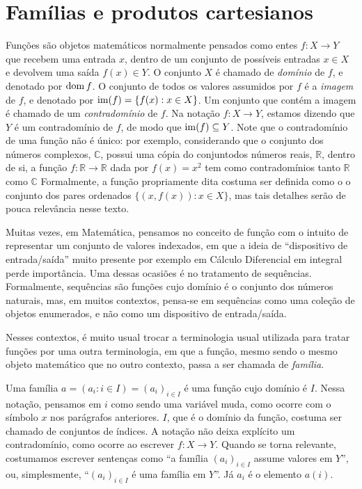 \section{Famílias e produtos cartesianos}
Funções são objetos matemáticos normalmente pensados como entes $f:X\rightarrow Y$ que recebem uma entrada $x$, dentro de um conjunto de possíveis entradas $x \in X$ e devolvem uma saída $f(x)\in Y$.
O conjunto $X$ é chamado de \emph{domínio} de $f$, e denotado por $\operatorname{dom} f$. O conjunto de todos os valores assumidos por $f$ é a \emph{imagem} de $f$, e denotado por $\operatorname{im}(f)=\{f(x): x \in X\}$.
Um conjunto que contém a imagem é chamado de um \emph{contradomínio} de $f$.
Na notação $f:X\rightarrow Y$, estamos dizendo que $Y$ é um contradomínio de $f$, de modo que $\operatorname{im}(f)\subseteq Y$.
Note que o contradomínio de uma função não é único: por exemplo, considerando que o conjunto dos números complexos, $\mathbb C$, possui uma cópia do conjuntodos números reais, $\mathbb R$, dentro de si, a função $f:\mathbb R\rightarrow \mathbb R$ dada por $f(x)=x^2$ tem como contradomínios tanto $\mathbb R$ como $\mathbb C$
Formalmente, a função propriamente dita costuma ser definida como o o conjunto dos pares ordenados $\{(x, f(x)): x \in X\}$, mas tais detalhes serão de pouca relevância nesse texto.

Muitas vezes, em Matemática, pensamos no conceito de função com o intuito de representar um conjunto de valores indexados, em que a ideia de ``dispositivo de entrada/saída'' muito presente por exemplo em Cálculo Diferencial em integral perde importância. Uma dessas ocasiões é no tratamento de sequências. Formalmente, sequências são funções cujo domínio é o conjunto dos números naturais, mas, em muitos contextos, pensa-se em sequências como uma coleção de objetos enumerados, e não como um dispositivo de entrada/saída.

Nesses contextos, é muito usual trocar a terminologia usual utilizada para tratar funções por uma outra terminologia, em que a função, mesmo sendo o mesmo objeto matemático que no outro contexto, passa a ser chamada de \emph{família}.

Uma família $a=(a_i: i \in I)=(a_i)_{i \in I}$ é uma função cujo domínio é $I$.
Nessa notação, pensamos em $i$ como sendo uma variável muda, como ocorre com o símbolo $x$ nos parágrafos anteriores.
$I$, que é o domínio da função, costuma ser chamado de conjuntos de índices.
A notação não deixa explícito um contradomínio, como ocorre ao escrever $f:X\rightarrow Y$.
Quando se torna relevante, costumamos escrever sentenças como ``a família $(a_i)_{i \in I}$ assume valores em $Y$'', ou, simplesmente, ``$(a_i)_{i \in I}$ é uma família em $Y$''.
Já $a_i$ é o elemento $a(i)$.

